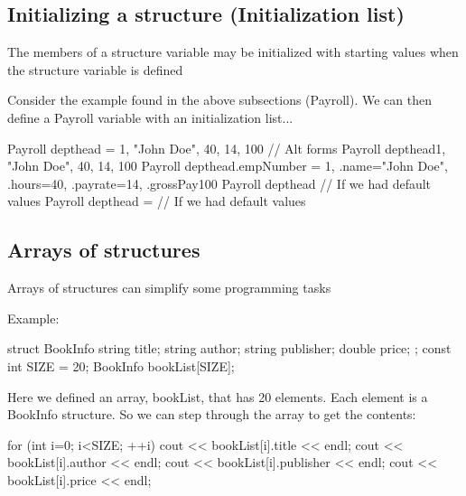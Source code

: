 \documentclass{report}
\begin{document}
	\bigbreak \noindent 
	\subsection{Initializing a structure (Initialization list)}
	\bigbreak \noindent 
	\begin{concept}
	   The members of a structure variable may be initialized with starting values when the structure variable is defined 
	\end{concept}
	\bigbreak \noindent 
	Consider the example found in the above subsections (Payroll). We can then define a Payroll variable with an initialization list...
	\bigbreak \noindent 
	
	\begin{cppcode}
Payroll depthead = {1, "John Doe", 40, 14, 100}
// Alt forms
Payroll depthead{1, "John Doe", 40, 14, 100} 
Payroll depthead{.empNumber = 1, .name="John Doe", .hours=40, .payrate=14, .grossPay100}
Payroll depthead{} // If we had default values
Payroll depthead = {} // If we had default values
	\end{cppcode}
	

	\pagebreak
	\subsection{Arrays of structures}
	\bigbreak \noindent 
	\begin{concept}
	   Arrays of structures can simplify some programming tasks 
	\end{concept}
	\bigbreak \noindent 
	Example:
	\bigbreak \noindent 
	
	\begin{cppcode}
struct BookInfo {
    string title;
    string author;
    string publisher;
    double price;
};
const int SIZE = 20;
BookInfo bookList[SIZE];
	\end{cppcode}
	
	\bigbreak \noindent 
	Here we defined an array, bookList, that has 20 elements. Each element is a BookInfo structure.
	\bigbreak \noindent 
	So we can step through the array to get the contents:
	\bigbreak \noindent 
	
	\begin{cppcode}
for (int i=0; i<SIZE; ++i) {
        cout << bookList[i].title << endl;
        cout << bookList[i].author << endl;
        cout << bookList[i].publisher << endl;
        cout << bookList[i].price << endl;
    }
	\end{cppcode}
	
	\bigbreak \noindent 
\end{document}
